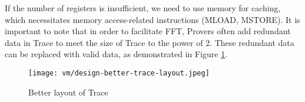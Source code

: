 If the number of registers is insufficient, we need to use memory for caching, which necessitates memory access-related instructions (MLOAD, MSTORE). 
It is important to note that in order to facilitate FFT, Provers often add redundant data in Trace to meet the size of Trace to the power of 2. 
These redundant data can be replaced with valid data, as demonstrated in Figure \ref{fig:design-better-trace-layout}.

\begin{figure}[!ht]
    \centering
    \texttt{[image: vm/design-better-trace-layout.jpeg]}
    \caption{Better layout of Trace}
    \label{fig:design-better-trace-layout}
\end{figure}
